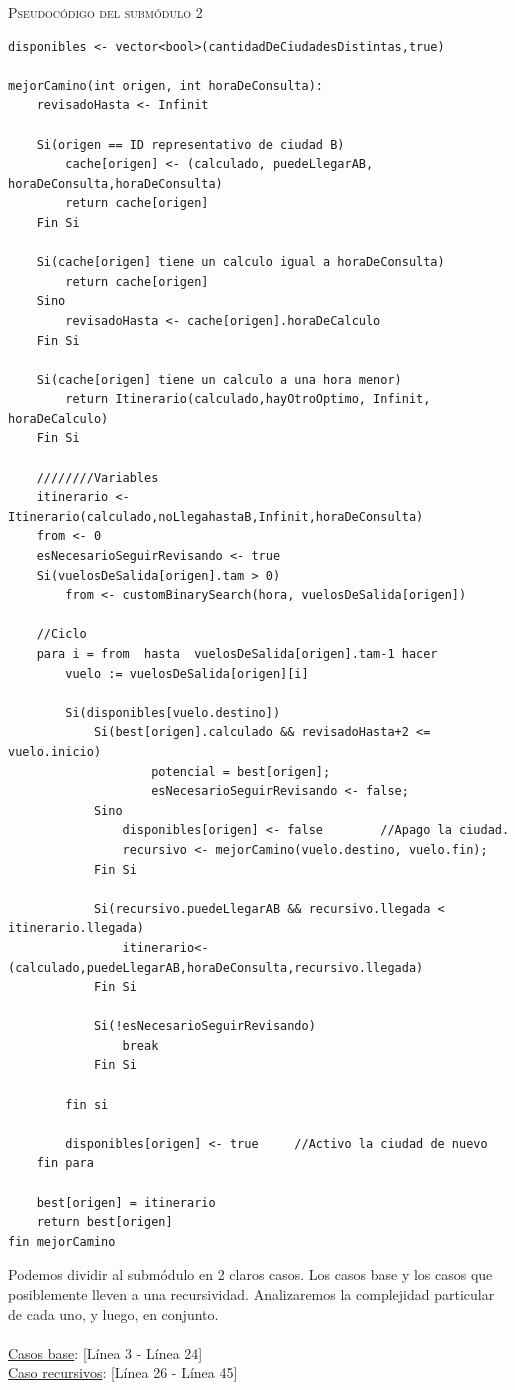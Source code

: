 \documentclass[10pt,a4paper]{article}
\begin{document}
\textsc{Pseudocódigo del submódulo 2}

\begin{lstlisting}
disponibles <- vector<bool>(cantidadDeCiudadesDistintas,true)

mejorCamino(int origen, int horaDeConsulta):
	revisadoHasta <- Infinit	
	
	Si(origen == ID representativo de ciudad B)
		cache[origen] <- (calculado, puedeLlegarAB, horaDeConsulta,horaDeConsulta)
		return cache[origen]
	Fin Si
	
	Si(cache[origen] tiene un calculo igual a horaDeConsulta)
		return cache[origen]	
	Sino
		revisadoHasta <- cache[origen].horaDeCalculo
	Fin Si
	
	Si(cache[origen] tiene un calculo a una hora menor)
	 	return Itinerario(calculado,hayOtroOptimo, Infinit, horaDeCalculo)
	Fin Si
	
	////////Variables
	itinerario <- Itinerario(calculado,noLlegahastaB,Infinit,horaDeConsulta)
	from <- 0
	esNecesarioSeguirRevisando <- true
	Si(vuelosDeSalida[origen].tam > 0)
		from <- customBinarySearch(hora, vuelosDeSalida[origen])
	
	//Ciclo
	para i = from  hasta  vuelosDeSalida[origen].tam-1 hacer
		vuelo := vuelosDeSalida[origen][i]

		Si(disponibles[vuelo.destino])
			Si(best[origen].calculado && revisadoHasta+2 <= vuelo.inicio)
					potencial = best[origen];
					esNecesarioSeguirRevisando <- false;
			Sino			
				disponibles[origen] <- false		//Apago la ciudad.
				recursivo <- mejorCamino(vuelo.destino, vuelo.fin);
			Fin Si
			
			Si(recursivo.puedeLlegarAB && recursivo.llegada < itinerario.llegada)
				itinerario<-(calculado,puedeLlegarAB,horaDeConsulta,recursivo.llegada)
			Fin Si
			
			Si(!esNecesarioSeguirRevisando)
				break
			Fin Si
			
		fin si
		
		disponibles[origen] <- true		//Activo la ciudad de nuevo
	fin para
	
	best[origen] = itinerario
	return best[origen]
fin mejorCamino
\end{lstlisting}

Podemos dividir al submódulo en 2 claros casos. Los casos base y los casos que posiblemente lleven a una recursividad. Analizaremos la complejidad particular de cada uno, y luego, en conjunto.\\ \\
\underline{Casos base}: [Línea 3 - Línea 24] \\
\underline{Caso recursivos}: [Línea 26 - Línea 45]\\
\end{document}
